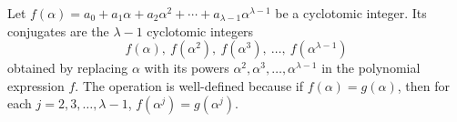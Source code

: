 Let $f(\alpha) = a_0 + a_1\alpha + a_2\alpha^2 + \cdots + a_{\lambda-1}\alpha^{\lambda-1}$ be a cyclotomic integer. Its conjugates are the $\lambda-1$ cyclotomic integers
$$f(\alpha),\ f(\alpha^2),\ f(\alpha^3),\ \ldots,\ f(\alpha^{\lambda-1})$$
obtained by replacing $\alpha$ with its powers $\alpha^2, \alpha^3, \ldots, \alpha^{\lambda-1}$ in the polynomial expression $f$. The operation is well-defined because if $f(\alpha) = g(\alpha)$, then for each $j = 2, 3, \ldots, \lambda-1$, $f(\alpha^j) = g(\alpha^j)$.
